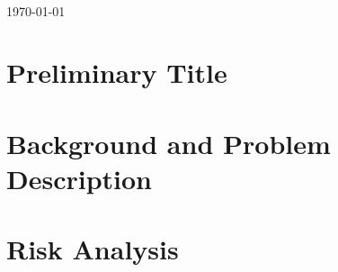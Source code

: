 \documentclass[12pt]{article} %
\begin{document}
\begin{titlepage}
\begin{figure}[!h]
      \label{fig:Triangulation}
\end{figure}

\begin{minipage}{0.4\textwidth}
\end{minipage}\\[1cm]
{\large \today}\\[3cm] %


\vfill %

\end{titlepage}



\newpage %


\section{Preliminary Title} %





\section{Background and Problem Description} %




\section{Risk Analysis} %







\newpage

\begin{appendices}

\end{appendices}
\end{document}
